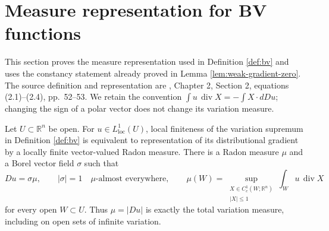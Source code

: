 \chapter{Measure representation for BV functions}\label{sec:bv-representation-calculus}
This section proves the measure representation used in Definition \ref{def:bv} and uses the constancy statement already proved in Lemma \ref{lem:weak-gradient-zero}. The source definition and representation are \cite{Sim18}, Chapter 2, Section 2, equations (2.1)--(2.4), pp.~52--53. We retain the convention $\int u\,\operatorname{div}X=-\int X\cdot dDu$; changing the sign of a polar vector does not change its variation measure.

\begin{proposition}\label{prop:bv-vector-representation}
Let $U\subset\mathbb R^n$ be open. For $u\in L^1_{\mathrm{loc}}(U)$, local finiteness of the variation supremum in Definition \ref{def:bv} is equivalent to representation of its distributional gradient by a locally finite vector-valued Radon measure. There is a Radon measure $\mu$ and a Borel vector field $\sigma$ such that
\[
 Du=\sigma\mu,\qquad |\sigma|=1\quad\mu\text{-almost everywhere},\qquad
 \mu(W)=\sup_{\substack{X\in C_c^1(W;\mathbb R^n)\\ |X|\leq1}}\int_Wu\,\operatorname{div}X
\]
for every open $W\subset U$. Thus $\mu=|Du|$ is exactly the total variation measure, including on open sets of infinite variation.
\end{proposition}
